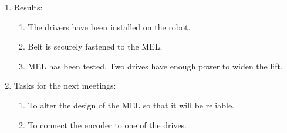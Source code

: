 \begin{enumerate}
\begin{enumerate}
    \end{enumerate}
    
	\item Results: 
	\begin{enumerate}
	  \item	The drivers have been installed on the robot.
	  
	  \item	Belt is securely fastened to the MEL.
	  
	  \item	MEL has been tested. Two drives have enough power to widen the lift.
	  
    \end{enumerate}
    
	\item Tasks for the next meetings:
	\begin{enumerate}
	  \item To alter the design of the MEL so that it will be reliable.
	  
	  \item To connect the encoder to one of the drives.
	  
    \end{enumerate}     
\end{enumerate}
\fillpage
